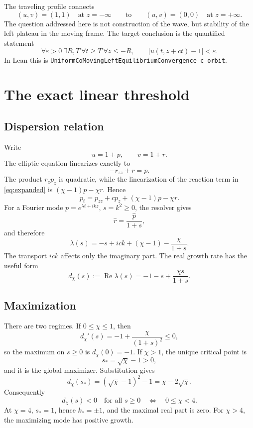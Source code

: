 \documentclass[11pt]{article}
\newcommand{\abs}[1]{\left\lvert #1\right\rvert}
\newcommand{\code}[1]{\nolinkurl{#1}}
\begin{document}
The traveling profile connects
\[
  (u,v)=(1,1)\quad\text{at }z=-\infty
  \qquad\text{to}\qquad
  (u,v)=(0,0)\quad\text{at }z=+\infty.
\]
The question addressed here is not construction of the wave, but stability
of the left plateau in the moving frame.  The target conclusion is the
quantified statement
\begin{equation}
 \forall\varepsilon>0\ \exists R,T\ \forall t\ge T\ \forall z\le-R,
 \qquad \abs{u(t,z+ct)-1}<\varepsilon.                  \label{eq:uniform-left}
\end{equation}
In Lean this is
\code{UniformCoMovingLeftEquilibriumConvergence c orbit}.

\section{The exact linear threshold}

\subsection{Dispersion relation}

Write
\[
  u=1+p,\qquad v=1+r.
\]
The elliptic equation linearizes exactly to
\[
  -r_{zz}+r=p.
\]
The product \(r_zp_z\) is quadratic, while the linearization of the reaction
term in \eqref{eq:expanded} is \((\chi-1)p-\chi r\).  Hence
\[
  p_t=p_{zz}+cp_z+(\chi-1)p-\chi r.
\]
For a Fourier mode \(p=e^{\lambda t+ikz}\), \(s=k^2\ge0\), the resolver gives
\[
  \widehat r=\frac{\widehat p}{1+s},
\]
and therefore
\begin{equation}
 \lambda(s)=-s+ick+(\chi-1)-\frac{\chi}{1+s}.
 \label{eq:lambda}
\end{equation}
The transport \(ick\) affects only the imaginary part.  The real growth rate
has the useful form
\begin{equation}
 d_\chi(s):=\operatorname{Re}\lambda(s)
   =-1-s+\frac{\chi s}{1+s}.                            \label{eq:dispersion}
\end{equation}

\subsection{Maximization}

There are two regimes.  If \(0\le\chi\le1\), then
\[
  d_\chi'(s)=-1+\frac{\chi}{(1+s)^2}\le0,
\]
so the maximum on \(s\ge0\) is \(d_\chi(0)=-1\).
If \(\chi>1\), the unique critical point is
\[
  s_*=\sqrt\chi-1>0,
\]
and it is the global maximizer.  Substitution gives
\begin{equation}
  d_\chi(s_*)=(\sqrt\chi-1)^2-1
             =\chi-2\sqrt\chi.                         \label{eq:max}
\end{equation}
Consequently
\[
  d_\chi(s)<0\quad\text{for all }s\ge0
  \quad\Longleftrightarrow\quad 0\le\chi<4.
\]
At \(\chi=4\), \(s_*=1\), hence \(k_*=\pm1\), and the maximal real part is
zero.  For \(\chi>4\), the maximizing mode has positive growth.
\end{document}
